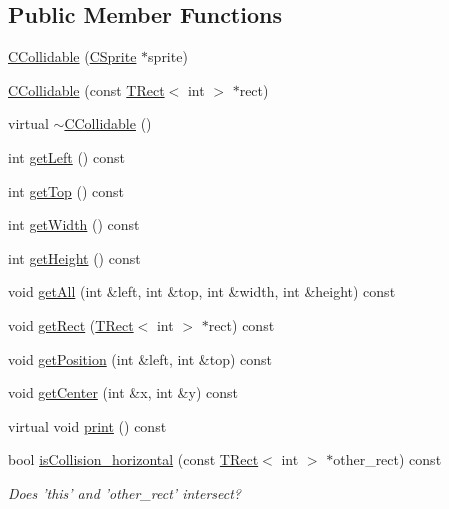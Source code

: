 \subsection*{Public Member Functions}
\begin{DoxyCompactItemize}
\item 
\hyperlink{classengine_1_1CCollidable_af462862c9147ddecb794456bac7d24af}{C\-Collidable} (\hyperlink{classengine_1_1CSprite}{C\-Sprite} $\ast$sprite)
\item 
\hyperlink{classengine_1_1CCollidable_a0cf5d0adac82ce344fa0a9944739d87b}{C\-Collidable} (const \hyperlink{classengine_1_1TRect}{T\-Rect}$<$ int $>$ $\ast$rect)
\item 
virtual \hyperlink{classengine_1_1CCollidable_aab6e393808cd5f3a6144889df36e9523}{$\sim$\-C\-Collidable} ()
\item 
int \hyperlink{classengine_1_1CCollidable_a4144d3b4711ae7570f6b122e5b4e1435}{get\-Left} () const 
\item 
int \hyperlink{classengine_1_1CCollidable_adb2d96cc98dc4b6ed5a26cd9129e1d2d}{get\-Top} () const 
\item 
int \hyperlink{classengine_1_1CCollidable_afba2923113db4ebde67912978885ec72}{get\-Width} () const 
\item 
int \hyperlink{classengine_1_1CCollidable_a6436c774e28bcbee83472f91c059283a}{get\-Height} () const 
\item 
void \hyperlink{classengine_1_1CCollidable_a0945e8a00846ff20ecdd86102afe04aa}{get\-All} (int \&left, int \&top, int \&width, int \&height) const 
\item 
void \hyperlink{classengine_1_1CCollidable_ae026a66abb2bfa169227255335d9f78b}{get\-Rect} (\hyperlink{classengine_1_1TRect}{T\-Rect}$<$ int $>$ $\ast$rect) const 
\item 
void \hyperlink{classengine_1_1CCollidable_a60fa629f81692094f135d01c2a4f5b69}{get\-Position} (int \&left, int \&top) const 
\item 
void \hyperlink{classengine_1_1CCollidable_a1855752c68f9d17856ce6c48234818fc}{get\-Center} (int \&x, int \&y) const 
\item 
virtual void \hyperlink{classengine_1_1CCollidable_a94c0157c8fdd9fccbfe8cdd726da2473}{print} () const 
\item 
bool \hyperlink{classengine_1_1CCollidable_a1eca3fcd9ed995b5e2d7ea4d1c6d6a60}{is\-Collision\-\_\-horizontal} (const \hyperlink{classengine_1_1TRect}{T\-Rect}$<$ int $>$ $\ast$other\-\_\-rect) const 
\begin{DoxyCompactList}\small\item\em Does 'this' and 'other\-\_\-rect' intersect? \end{DoxyCompactList}\item 

\end{DoxyCompactItemize}
